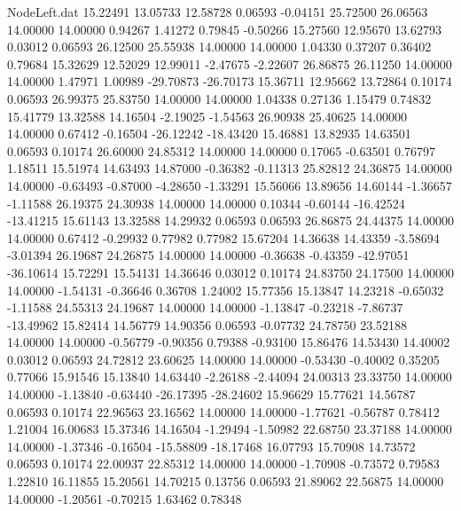\begin{filecontents}{NodeLeft.dat}
  15.22491   13.05733   12.58728     0.06593   -0.04151   25.72500   26.06563   14.00000   14.00000    0.94267    1.41272    0.79845   -0.50266
  15.27560   12.95670   13.62793     0.03012    0.06593   26.12500   25.55938   14.00000   14.00000    1.04330    0.37207    0.36402    0.79684
  15.32629   12.52029   12.99011    -2.47675   -2.22607   26.86875   26.11250   14.00000   14.00000    1.47971    1.00989  -29.70873  -26.70173
  15.36711   12.95662   13.72864     0.10174    0.06593   26.99375   25.83750   14.00000   14.00000    1.04338    0.27136    1.15479    0.74832
  15.41779   13.32588   14.16504    -2.19025   -1.54563   26.90938   25.40625   14.00000   14.00000    0.67412   -0.16504  -26.12242  -18.43420
  15.46881   13.82935   14.63501     0.06593    0.10174   26.60000   24.85312   14.00000   14.00000    0.17065   -0.63501    0.76797    1.18511
  15.51974   14.63493   14.87000    -0.36382   -0.11313   25.82812   24.36875   14.00000   14.00000   -0.63493   -0.87000   -4.28650   -1.33291
  15.56066   13.89656   14.60144    -1.36657   -1.11588   26.19375   24.30938   14.00000   14.00000    0.10344   -0.60144  -16.42524  -13.41215
  15.61143   13.32588   14.29932     0.06593    0.06593   26.86875   24.44375   14.00000   14.00000    0.67412   -0.29932    0.77982    0.77982
  15.67204   14.36638   14.43359    -3.58694   -3.01394   26.19687   24.26875   14.00000   14.00000   -0.36638   -0.43359  -42.97051  -36.10614
  15.72291   15.54131   14.36646     0.03012    0.10174   24.83750   24.17500   14.00000   14.00000   -1.54131   -0.36646    0.36708    1.24002
  15.77356   15.13847   14.23218    -0.65032   -1.11588   24.55313   24.19687   14.00000   14.00000   -1.13847   -0.23218   -7.86737  -13.49962
  15.82414   14.56779   14.90356     0.06593   -0.07732   24.78750   23.52188   14.00000   14.00000   -0.56779   -0.90356    0.79388   -0.93100
  15.86476   14.53430   14.40002     0.03012    0.06593   24.72812   23.60625   14.00000   14.00000   -0.53430   -0.40002    0.35205    0.77066
  15.91546   15.13840   14.63440    -2.26188   -2.44094   24.00313   23.33750   14.00000   14.00000   -1.13840   -0.63440  -26.17395  -28.24602
  15.96629   15.77621   14.56787     0.06593    0.10174   22.96563   23.16562   14.00000   14.00000   -1.77621   -0.56787    0.78412    1.21004
  16.00683   15.37346   14.16504    -1.29494   -1.50982   22.68750   23.37188   14.00000   14.00000   -1.37346   -0.16504  -15.58809  -18.17468
  16.07793   15.70908   14.73572     0.06593    0.10174   22.00937   22.85312   14.00000   14.00000   -1.70908   -0.73572    0.79583    1.22810
  16.11855   15.20561   14.70215     0.13756    0.06593   21.89062   22.56875   14.00000   14.00000   -1.20561   -0.70215    1.63462    0.78348

\end{filecontents}
